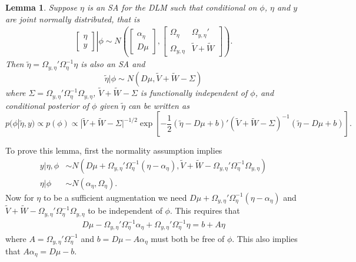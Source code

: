 \documentclass{article}
\newtheorem{lem}[thm]{Lemma}
\begin{document}
\begin{lem}\label{noSA}
Suppose $\eta$ is an SA for the DLM such that conditional on $\phi$, $\eta$ and $y$ are joint normally distributed, that is 
\begin{align*}
 \left. \begin{bmatrix}\eta \\ y \end{bmatrix}\right|\phi \sim N\left(\begin{bmatrix} \alpha_\eta \\ D\mu \end{bmatrix}, \begin{bmatrix} 
   \Omega_\eta & \Omega_{y,\eta}' \\
   \Omega_{y,\eta} & \tilde{V} + \tilde{W} \end{bmatrix}\right).
\end{align*}
Then $\tilde{\eta}=\Omega_{y,\eta}'\Omega_{\eta}^{-1}\eta$ is also an SA and
\[
\tilde{\eta}|\phi \sim N(D\mu,\tilde{V} + \tilde{W} - \Sigma)
\]
where $\Sigma=\Omega_{y,\eta}'\Omega_{\eta}^{-1}\Omega_{y,\eta}$, $\tilde{V} + \tilde{W} - \Sigma$ is functionally independent of $\phi$, and conditional posterior of $\phi$ given $\tilde{\eta}$ can be written as
\[
p(\phi|\tilde{\eta},y) \propto p(\phi)\propto |\tilde{V} + \tilde{W} - \Sigma|^{-1/2}\exp\left[-\frac{1}{2}(\tilde{\eta} - D\mu + b)'(\tilde{V} + \tilde{W} - \Sigma)^{-1}(\tilde{\eta} - D\mu + b)\right].
\]
\end{lem}
To prove this lemma, first the normality assumption implies
\begin{align*}
  y|\eta,\phi &\sim N(D\mu + \Omega_{y,\eta}'\Omega_\eta^{-1}(\eta - \alpha_\eta), \tilde{V} + \tilde{W} - \Omega_{y,\eta}'\Omega_{\eta}^{-1}\Omega_{y,\eta})\\
  \eta|\phi &\sim N(\alpha_\eta, \Omega_\eta).
\end{align*}
Now for $\eta$ to be a sufficient augmentation we need $D\mu + \Omega_{y,\eta}'\Omega_\eta^{-1}(\eta - \alpha_\eta)$ and $\tilde{V} + \tilde{W} - \Omega_{y,\eta}'\Omega_{\eta}^{-1}\Omega_{y,\eta}$
to be independent of $\phi$. This requires that
\begin{align*}
  D\mu - \Omega_{y,\eta}'\Omega_\eta^{-1}\alpha_\eta + \Omega_{y,\eta}'\Omega_\eta^{-1}\eta  = b + A\eta
\end{align*}
where $A=\Omega_{y,\eta}'\Omega_\eta^{-1}$ and $b=D\mu - A\alpha_\eta$ must both be free of $\phi$. This also implies that $A\alpha_\eta = D\mu - b$.
\end{document}

